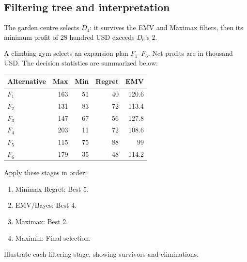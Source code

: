 \subsection*{Filtering tree and interpretation}
\begin{center}
\end{center}
The garden centre selects $D_4$: it survives the EMV and Maximax filters, then its minimum profit of 28 hundred USD exceeds $D_6$'s 2.
\secInicio[sec:q3]

A climbing gym selects an expansion plan $F_1$--$F_6$. Net profits are in thousand USD. The decision statistics are summarized below:
\vspace{-3mm}
\begin{center}\small\setlength{\tabcolsep}{4pt}
	\begin{tabular}{lrrrr}\toprule
		Alternative & Max & Min & Regret & EMV\\ \midrule
		$F_1$ & 163 & 51 & 40 & 120.6\\
		$F_2$ & 131 & 83 & 72 & 113.4\\
		$F_3$ & 147 & 67 & 56 & 127.8\\
		$F_4$ & 203 & 11 & 72 & 108.6\\
		$F_5$ & 115 & 75 & 88 & 99\\
		$F_6$ & 179 & 35 & 48 & 114.2\\
		\bottomrule
	\end{tabular}
\end{center}
\vspace{-3mm}
Apply these stages in order:
\begin{enumerate}[leftmargin=*]
	\item Minimax Regret: Best 5.
	\item EMV/Bayes: Best 4.
	\item Maximax: Best 2.
	\item Maximin: Final selection.
\end{enumerate}
Illustrate each filtering stage, showing survivors and eliminations.
\label{sol:q4table}
